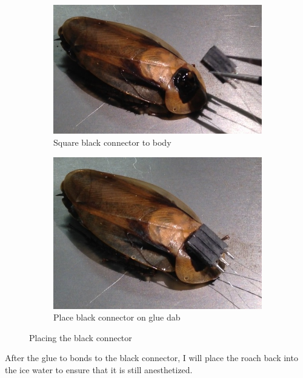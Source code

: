 \begin{figure}[ht!]
\centering
    \begin{subfigure}{.5\textwidth}
    \centering
    \includegraphics[scale=0.3]{Surgery Photos/connector1.JPG}
    \caption{Square black connector to body}
    \label{fig:connector1}
    \end{subfigure}
    \begin{subfigure}{.5\textwidth}
    \centering
    \includegraphics[scale=0.3]{Surgery Photos/connector2.JPG}
    \caption{Place black connector on glue dab}
    \label{fig:connector2}
    \end{subfigure}
\caption{Placing the black connector}
\label{fig:connector}
\end{figure}
After the glue to bonds to the black connector, I will place the roach back into the ice water to ensure that it is still anesthetized.

